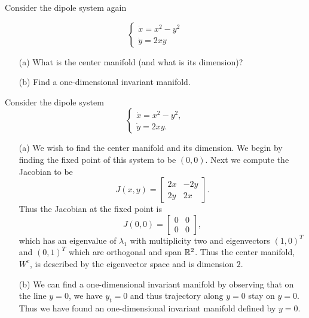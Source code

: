 \documentclass[12pt]{report}
\begin{document}
\newpage




\begin{problem}
    Consider the dipole system again

\begin{equation}
\left\{\begin{array}{l}
\dot x= x^2 - y^2  \\
\dot y = 2 x y 
\end{array}\right.
\end{equation}

\begin{enumerate}
    \item [(a)] What is the center manifold (and what is its dimension)?  
    \item [(b)] Find a one-dimensional invariant manifold. 
\end{enumerate}
\end{problem}

\begin{solution}

    \noindent
    Consider the dipole system
    \[ 
    \left\{\begin{array}{l}
    \dot x= x^2 - y^2,  \\
    \dot y = 2 x y.
    \end{array}\right.
    \]
    \begin{enumerate}
        \item [(a)] 
        We wish to find the center manifold and its dimension. We begin by finding the fixed point of this system to be $(0,0)$. Next we compute the Jacobian to be
        \[ 
            J(x,y) = \begin{bmatrix}
                2x & -2y\\
                2y & 2x
            \end{bmatrix}.
        \]
        Thus the Jacobian at the fixed point is
        \[ 
            J(0,0) = \begin{bmatrix}
                0 & 0 \\ 0 & 0
            \end{bmatrix},
        \]
        which has an eigenvalue of $\lambda_1$ with multiplicity two and eigenvectors $(1,0)^T$ and $(0,1)^T$ which are orthogonal and span ${\mathbb R}^2$. Thus the center manifold, $W^c$, is described by the eigenvector space and is dimension $2$. 
        
        \item [(b)] We can find a one-dimensional invariant manifold by observing that on the line $y=0$, we have $y_t=0$ and thus trajectory along $y=0$ stay on $y=0$. Thus we have found an one-dimensional invariant manifold defined by $y=0$.
    \end{enumerate}
\end{solution}
\end{document}
